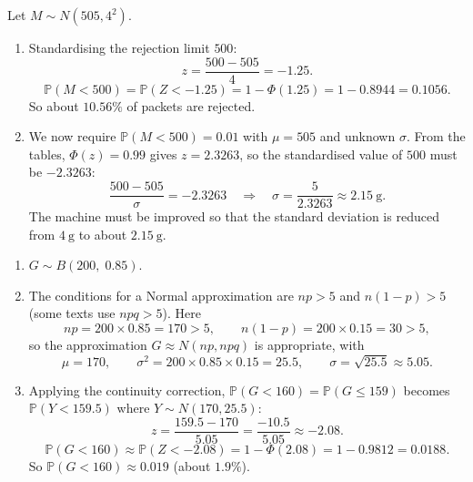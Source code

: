 \documentclass[11pt]{article}
\newcommand{\cle}[1]{{\popxbold\color{popdark}#1}}
\begin{document}
\begin{corrige}
Let $M \sim N(505, 4^2)$.
\begin{enumerate}
\item Standardising the rejection limit $500$:
\[
z = \frac{500 - 505}{4} = -1.25.
\]
\[
\mathbb{P}(M < 500) = \mathbb{P}(Z < -1.25) = 1 - \Phi(1.25) = 1 - 0.8944 = 0.1056.
\]
So about $\mathbf{10.56\%}$ of packets are rejected.
\item We now require $\mathbb{P}(M < 500) = 0.01$ with $\mu = 505$ and unknown $\sigma$. From the tables, $\Phi(z) = 0.99$ gives $z = 2.3263$, so the standardised value of $500$ must be $-2.3263$:
\[
\frac{500 - 505}{\sigma} = -2.3263 \quad\Longrightarrow\quad \sigma = \frac{5}{2.3263} \approx 2.15\ \mathrm{g}.
\]
The machine must be improved so that the standard deviation is reduced from $4\ \mathrm{g}$ to about $2.15\ \mathrm{g}$.
\end{enumerate}
\end{corrige}

\begin{corrige}
\begin{enumerate}
\item $G \sim B(200,\; 0.85)$.
\item The conditions for a Normal approximation are $np > 5$ and $n(1-p) > 5$ (some texts use $npq > 5$). Here
\[
np = 200 \times 0.85 = 170 > 5, \qquad n(1-p) = 200 \times 0.15 = 30 > 5,
\]
so the approximation $G \approx N(np, npq)$ is appropriate, with
\[
\mu = 170, \qquad \sigma^2 = 200 \times 0.85 \times 0.15 = 25.5, \qquad \sigma = \sqrt{25.5} \approx 5.05.
\]
\item Applying the \cle{continuity correction}, $\mathbb{P}(G < 160) = \mathbb{P}(G \le 159)$ becomes $\mathbb{P}(Y < 159.5)$ where $Y \sim N(170, 25.5)$:
\[
z = \frac{159.5 - 170}{5.05} = \frac{-10.5}{5.05} \approx -2.08.
\]
\[
\mathbb{P}(G < 160) \approx \mathbb{P}(Z < -2.08) = 1 - \Phi(2.08) = 1 - 0.9812 = 0.0188.
\]
So $\mathbb{P}(G < 160) \approx 0.019$ (about $1.9\%$).
\end{enumerate}
\end{corrige}
\end{document}
